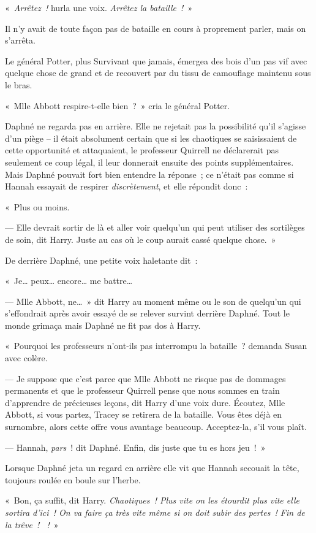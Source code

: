 «~\emph{Arrêtez~!} hurla une voix. \emph{Arrêtez la bataille~!}~»

Il n'y avait de toute façon pas de bataille en cours à proprement parler, mais on s'arrêta.

Le général Potter, plus Survivant que jamais, émergea des bois d'un pas vif avec quelque chose de grand et de recouvert par du tissu de camouflage maintenu sous le bras.

«~Mlle Abbott respire-t-elle bien~?~» cria le général Potter.

Daphné ne regarda pas en arrière. Elle ne rejetait pas la possibilité qu'il s'agisse d'un piège -- il était absolument certain que si les chaotiques se saisissaient de cette opportunité et attaquaient, le professeur Quirrell ne déclarerait pas seulement ce coup légal, il leur donnerait ensuite des points supplémentaires. Mais Daphné pouvait fort bien entendre la réponse~; ce n'était pas comme si Hannah essayait de respirer \emph{discrètement}, et elle répondit donc~:

«~Plus ou moins.

--- Elle devrait sortir de là et aller voir quelqu'un qui peut utiliser des sortilèges de soin, dit Harry. Juste au cas où le coup aurait cassé quelque chose.~»

De derrière Daphné, une petite voix haletante dit~:

«~Je… peux… encore… me battre…

--- Mlle Abbott, ne…~» dit Harry au moment même ou le son de quelqu'un qui s'effondrait après avoir essayé de se relever survint derrière Daphné. Tout le monde grimaça mais Daphné ne fit pas dos à Harry.

«~Pourquoi les professeurs n'ont-ils pas interrompu la bataille~? demanda Susan avec colère.

--- Je suppose que c'est parce que Mlle Abbott ne risque pas de dommages permanents et que le professeur Quirrell pense que nous sommes en train d'apprendre de précieuses leçons, dit Harry d'une voix dure. Écoutez, Mlle Abbott, si vous partez, Tracey se retirera de la bataille. Vous êtes déjà en surnombre, alors cette offre vous avantage beaucoup. Acceptez-la, s'il vous plaît.

--- Hannah, \emph{pars}~! dit Daphné. Enfin, dis juste que tu es hors jeu~!~»

Lorsque Daphné jeta un regard en arrière elle vit que Hannah secouait la tête, toujours roulée en boule sur l'herbe.

«~Bon, ça suffit, dit Harry. \emph{Chaotiques~! Plus vite on les étourdit plus vite elle sortira d'ici~! On va faire ça très vite même si on doit subir des pertes~! Fin de la trêve~! ~!}~»

